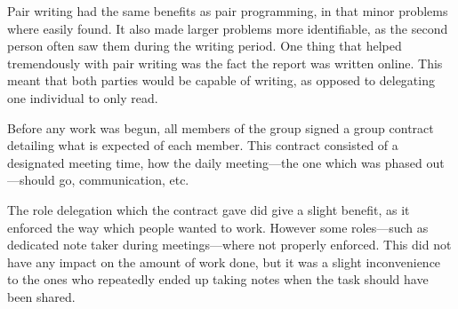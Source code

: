 Pair writing had the same benefits as pair programming, in that minor problems where easily found.
It also made larger problems more identifiable, as the second person often saw them during the writing period.
One thing that helped tremendously with pair writing was the fact the report was written online.
This meant that both parties would be capable of writing, as opposed to delegating one individual to only read.

Before any work was begun, all members of the group signed a group contract detailing what is expected of each member.
This contract consisted of a designated meeting time, how the daily meeting---the one which was phased out---should go, communication, etc.

The role delegation which the contract gave did give a slight benefit, as it enforced the way which people wanted to work.
However some roles---such as dedicated note taker during meetings---where not properly enforced. 
This did not have any impact on the amount of work done, but it was a slight inconvenience to the ones who repeatedly ended up taking notes when the task should have been shared.
